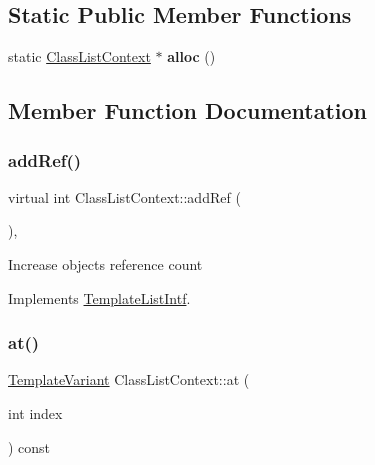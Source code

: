 \subsection*{Static Public Member Functions}
\begin{DoxyCompactItemize}
\item 
\mbox{\label{class_class_list_context_aece7e2280db611556d88b324c362b629}} 
static \mbox{\hyperlink{class_class_list_context}{Class\+List\+Context}} $\ast$ {\bfseries alloc} ()
\end{DoxyCompactItemize}


\subsection{Member Function Documentation}
\mbox{\label{class_class_list_context_a0eff9811a77d47277e1386394c374151}} 
\subsubsection{\texorpdfstring{addRef()}{addRef()}}
{\footnotesize\ttfamily virtual int Class\+List\+Context\+::add\+Ref (\begin{DoxyParamCaption}{ }\end{DoxyParamCaption})\hspace{0.3cm}{\ttfamily [inline]}, {\ttfamily [virtual]}}

Increase object\textquotesingle{}s reference count 

Implements \mbox{\hyperlink{class_template_list_intf_a4b4973e2e15396d10bc4e3085462ca2b}{Template\+List\+Intf}}.

\mbox{\label{class_class_list_context_a2ff974cf1cd295c866035d255bbb8b36}} 
\subsubsection{\texorpdfstring{at()}{at()}}
{\footnotesize\ttfamily \mbox{\hyperlink{class_template_variant}{Template\+Variant}} Class\+List\+Context\+::at (\begin{DoxyParamCaption}\item[{int}]{index }\end{DoxyParamCaption}) const\hspace{0.3cm}{\ttfamily [virtual]}}

